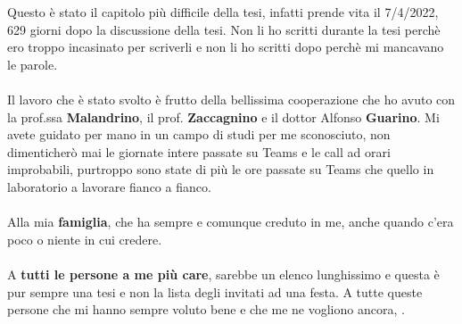 Questo è stato il capitolo più difficile della tesi, infatti prende vita il 7/4/2022, 629 giorni dopo la discussione della tesi. Non li ho scritti durante la tesi perchè ero troppo incasinato per scriverli e non li ho scritti dopo perchè mi mancavano le parole.\\
\\
Il lavoro che è stato svolto è frutto della bellissima cooperazione che ho avuto con la prof.ssa \textbf{Malandrino}, il prof. \textbf{Zaccagnino} e il dottor Alfonso \textbf{Guarino}. Mi avete guidato per mano in un campo di studi per me sconosciuto, non dimenticherò mai le giornate intere passate su Teams e le call ad orari improbabili, purtroppo sono state di più le ore passate su Teams che quello in laboratorio a lavorare fianco a fianco.\\
\\
Alla mia \textbf{famiglia}, che ha sempre e comunque creduto in me, anche quando c'era poco o niente in cui credere.\\
\\
A \textbf{tutti le persone a me più care}, sarebbe un elenco lunghissimo e questa è pur sempre una tesi e non la lista degli invitati ad una festa. A tutte queste persone che mi hanno sempre voluto bene e che me ne vogliono ancora, .
